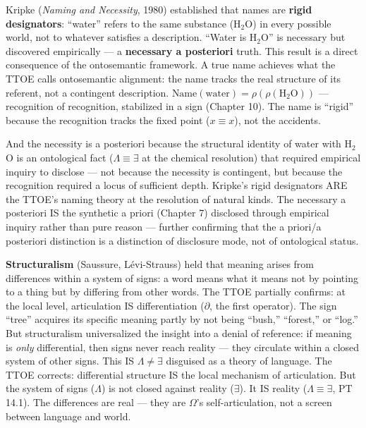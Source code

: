 \documentclass[10pt, openany, oneside]{book}
\begin{document}
Kripke (\textit{Naming and Necessity}, 1980) established that names are \textbf{rigid designators}: ``water'' refers to the same substance (H$_2$O) in every possible world, not to whatever satisfies a description. ``Water is H$_2$O'' is necessary but discovered empirically --- a \textbf{necessary a posteriori} truth. This result is a direct consequence of the ontosemantic framework. A true name achieves what the TTOE calls ontosemantic alignment: the name tracks the real structure of its referent, not a contingent description. $\text{Name}(\text{water}) = \rho(\rho(\text{H}_2\text{O}))$ --- recognition of recognition, stabilized in a sign (Chapter 10). The name is ``rigid'' because the recognition tracks the fixed point ($x \equiv x$), not the accidents.

And the necessity is a posteriori because the structural identity of water with H$_2$O is an ontological fact ($\Lambda \equiv \exists$ at the chemical resolution) that required empirical inquiry to disclose --- not because the necessity is contingent, but because the recognition required a locus of sufficient depth. Kripke's rigid designators ARE the TTOE's naming theory at the resolution of natural kinds. The necessary a posteriori IS the synthetic a priori (Chapter 7) disclosed through empirical inquiry rather than pure reason --- further confirming that the a priori/a posteriori distinction is a distinction of disclosure mode, not of ontological status.

\textbf{Structuralism} (Saussure, L\'{e}vi-Strauss) held that meaning arises from differences within a system of signs: a word means what it means not by pointing to a thing but by differing from other words. The TTOE partially confirms: at the local level, articulation IS differentiation ($\partial$, the first operator). The sign ``tree'' acquires its specific meaning partly by not being ``bush,'' ``forest,'' or ``log.'' But structuralism universalized the insight into a denial of reference: if meaning is \textit{only} differential, then signs never reach reality --- they circulate within a closed system of other signs. This IS $\Lambda \neq \exists$ disguised as a theory of language. The TTOE corrects: differential structure IS the local mechanism of articulation. But the system of signs ($\Lambda$) is not closed against reality ($\exists$). It IS reality ($\Lambda \equiv \exists$, PT 14.1). The differences are real --- they are $\Omega$'s self-articulation, not a screen between language and world.
\end{document}
